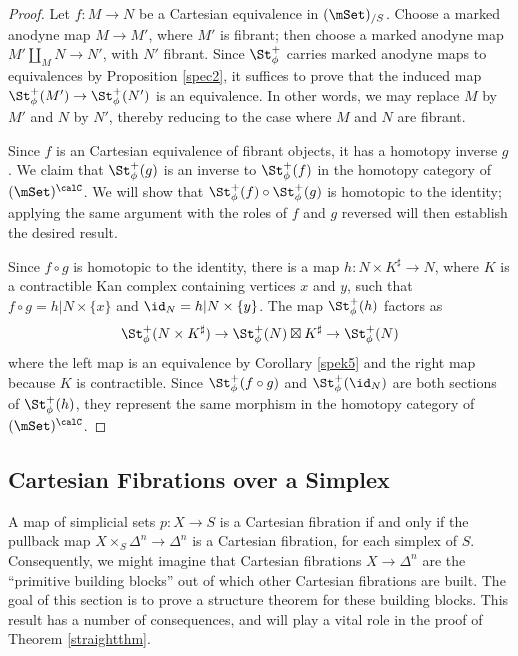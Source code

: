 \begin{proof}
Let $f: M \rightarrow N$ be a Cartesian equivalence in $(\mSet)_{/S}$. Choose
a marked anodyne map $M \rightarrow M'$, where $M'$ is fibrant; then choose a marked anodyne map $M' \coprod_M N \rightarrow N'$, with $N'$ fibrant. Since $\St^{+}_{\phi}$ carries marked anodyne maps to equivalences by Proposition \ref{spec2}, it suffices to prove that the induced map $\St^{+}_{\phi}(M') \rightarrow \St^{+}_{\phi}(N')$ is an equivalence. In other words, we may replace $M$ by $M'$ and $N$ by $N'$, thereby reducing to the case where $M$ and $N$ are fibrant.

Since $f$ is an Cartesian equivalence of fibrant objects, it has a homotopy inverse
$g$. We claim that $\St^{+}_{\phi}(g)$ is an inverse to $\St^{+}_{\phi}(f)$ in the homotopy category of $( \mSet )^{\calC}$. We will show that $\St^{+}_{\phi}(f) \circ \St^{+}_{\phi}(g)$ is homotopic to the identity; applying the same argument with the roles of $f$ and $g$ reversed will then establish the desired result.

Since $f \circ g$ is homotopic to the identity, there is a map $h: N \times K^{\sharp} \rightarrow N$, where $K$ is a contractible Kan complex containing vertices $x$ and $y$, such that
$f \circ g = h| N \times \{x\}$ and $\id_N = h|N \times \{y\}$. The map $\St^{+}_{\phi}(h)$ factors as
$$ \St^{+}_{\phi}(N \times K^{\sharp}) \rightarrow \St^{+}_{\phi}(N) \boxtimes K^{\sharp} \rightarrow \St^{+}_{\phi}(N)$$
where the left map is an equivalence by Corollary \ref{spek5} and the right map because $K$ is contractible. Since $\St^{+}_{\phi}(f \circ g)$ and $\St^{+}_{\phi}( \id_N)$ are both sections of $\St^{+}_{\phi}(h)$, they represent the same morphism in the homotopy category of $(\mSet)^{\calC}$.
\end{proof}


\subsection{Cartesian Fibrations over a Simplex}\label{funkystructure}

A map of simplicial sets $p: X \rightarrow S$ is a Cartesian fibration if and only if the pullback map $X \times_S \Delta^n \rightarrow \Delta^n$ is a Cartesian fibration, for each simplex of $S$.
Consequently, we might imagine that Cartesian fibrations $X \rightarrow \Delta^n$ are the ``primitive building blocks'' out of which other Cartesian fibrations are built. The goal of this section is to prove a structure theorem for these building blocks. This result has a number of consequences, and will play a vital role in the proof of Theorem \ref{straightthm}.

